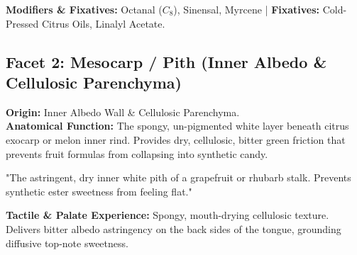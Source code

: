 \documentclass[11pt,a4paper]{article}
\begin{document}
\textbf{Modifiers \& Fixatives:} Octanal ($C_8$), Sinensal, Myrcene | \textbf{Fixatives:} Cold-Pressed Citrus Oils, Linalyl Acetate.

\vspace{1.5em}

\subsection{Facet 2: Mesocarp / Pith (Inner Albedo \& Cellulosic Parenchyma)}

\begin{botanicalbox}
\textbf{Origin:} Inner Albedo Wall \& Cellulosic Parenchyma.\\
\textbf{Anatomical Function:} The spongy, un-pigmented white layer beneath citrus exocarp or melon inner rind. Provides dry, cellulosic, bitter green friction that prevents fruit formulas from collapsing into synthetic candy.
\end{botanicalbox}

\begin{sensoryquote}
"The astringent, dry inner white pith of a grapefruit or rhubarb stalk. Prevents synthetic ester sweetness from feeling flat."
\end{sensoryquote}

\begin{flavourbox}
\textbf{Tactile \& Palate Experience:} Spongy, mouth-drying cellulosic texture. Delivers bitter albedo astringency on the back sides of the tongue, grounding diffusive top-note sweetness.
\end{flavourbox}

\begin{table}[htbp]
\centering
\caption{Primary Impact Actors for Facet 2 (Mesocarp / Pith)}
\vspace{0.3em}
\end{table}
\end{document}
